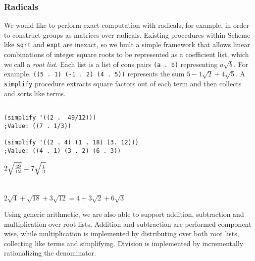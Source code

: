 \documentclass{article}
\begin{document}
            \subsubsection{Radicals}
            \label{rootlists}
            
            	We would like to perform exact computation with radicals, for example, in order to construct groups as matrices over radicals. Existing procedures within Scheme like \texttt{sqrt} and \texttt{expt} are inexact, so we built a simple framework that allows linear combinations of integer square roots to be represented as a coefficient list, which we call a \emph{root list}. Each list is a list of cons pairs \texttt{(a . b)} representing $a \sqrt{b}$. For example, \texttt{((5 . 1) (-1 . 2) (4 . 5))} represents the sum $5 - 1\sqrt{2} + 4\sqrt{5}$. A \texttt{simplify} procedure extracts square factors out of each term and then collects and sorts like terms.
	
\begin{minipage}[t]{0.5\textwidth}
\begin{verbatim}

(simplify '((2 .  49/12)))
;Value: ((7 . 1/3))

(simplify '((2 . 4) (1 . 18) (3. 12)))
;Value: ((4 . 1) (3 . 2) (6 . 3))

\end{verbatim}
\end{minipage}
\begin{minipage}[t]{0.5\textwidth}
$\\ 2\sqrt{\frac{49}{12}} = 7\sqrt{\frac{1}{3}}$\\ \\ \\
$2\sqrt{4} + \sqrt{18} + 3\sqrt{12} = 4 + 3\sqrt{2} + 6\sqrt{3}$
\end{minipage}	
				Using generic arithmetic, we are also able to support addition, subtraction and multiplication over root lists. Addition and subtraction are performed component wise, while multiplication is implemented by distributing over both root lists, collecting like terms and simplifying. Division is implemented by incrementally rationalizing the denominator.
				
\end{document}
